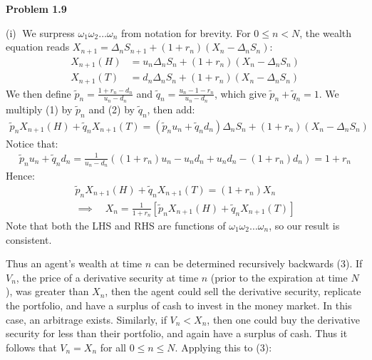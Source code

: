 \documentclass[12pt, letterpaper]{article}
\begin{document}
\rightline{$\square$}

\vspace{5mm}
\noindent
\textbf{Problem 1.9} 

\vspace{5mm}
\noindent
(i)$\;$ 
We surpress $\omega_1 \omega_2 \dots \omega_n$ from notation for brevity.
For $0\leq n < N$, the wealth equation reads $X_{n+1} = \Delta_n S_{n+1} + (1+r_n)(X_n - \Delta_n S_n)$:
\begin{align*}
    X_{n+1}(H) &= u_n \Delta_n S_n + (1+r_n)(X_n - \Delta_n S_n) \tag{1}\\
    X_{n+1}(T) &= d_n \Delta_n S_n + (1+r_n)(X_n - \Delta_n S_n) \tag{2}
\end{align*}
We then define $\tilde p_n = \frac{1+r_n-d_n}{u_n-d_n}$ and $\tilde q_n = \frac{u_n-1-r_n}{u_n-d_n}$, which give $\tilde p_n + \tilde q_n = 1$. We multiply (1) by $\tilde p_n$ and (2) by $\tilde q_n$, then add:
\begin{gather*}
    \tilde p_n X_{n+1}(H)+ \tilde q_n X_{n+1}(T) = (\tilde p_n u_n + \tilde q_n d_n) \Delta_n S_n + (1+r_n)(X_n - \Delta_n S_n)
\end{gather*}
Notice that:
\begin{gather*}
    \tilde p_n u_n + \tilde q_n d_n = \frac{1}{u_n-d_n} \left( (1+ r_n )u_n - u_n d_n + u_n d_n - (1 + r_n)d_n \right) = 1 + r_n
\end{gather*}
Hence:
\begin{gather*}
    \tilde p_n X_{n+1}(H)+ \tilde q_n X_{n+1}(T) = (1+r_n)X_n \\
    \implies \quad X_n = \frac{1}{1+r_n} \left[ \tilde p_n X_{n+1}(H)+ \tilde q_n X_{n+1}(T)\right] \tag{3}
\end{gather*}
Note that both the LHS and RHS are functions of $\omega_1 \omega_2 \dots \omega_n$, so our result is consistent.

\vspace{5mm}

Thus an agent's wealth at time $n$ can be determined recursively backwards (3).
If $V_n$, the price of a derivative security at time $n$ (prior to the expiration at time $N$), was greater than $X_n$,
then the agent could sell the derivative security, replicate the portfolio, and have a surplus of cash to invest in the money market.
In this case, an arbitrage exists.
Similarly, if $V_n < X_n$, then one could buy the derivative security for less than their portfolio, and again have a surplus of cash.
Thus it follows that $V_n = X_n$ for all $0 \leq n \leq N$.
Applying this to (3):
\end{document}
